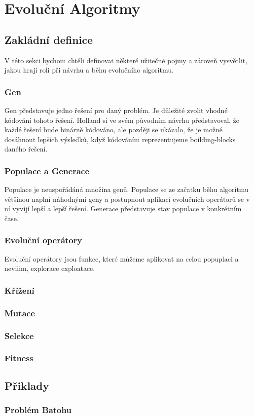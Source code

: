 \chapter{Evoluční Algoritmy}

\section{Zakládní definice}
V této sekci bychom chtěli definovat některé užitečné pojmy a zároveň vysvětlit, jakou hrají roli při návrhu a běhu evolučního algoritmu.
\subsection{Gen}
Gen představuje jedno řešení pro daný problém. Je důležité zvolit vhodné kódování tohoto řešení. Holland si ve svém původním návrhu představoval, že každé řešení bude binárně kódováno, ale později se ukázalo, že je možné dosáhnout lepších výsledků, když kódováním reprezentujeme boilding-blocks daného řešení.

\subsection{Populace a Generace}
Populace je neuspořádáná množina genů. Populace se ze začatku běhu algoritmu většinou naplní náhodnými geny a postupnout aplikací evolučních operátorů se v ní vyvíjí lepší a lepší řešení. Generace představuje stav populace v konkrétním čase.

\subsection{Evoluční operátory}
Evoluční operátory jsou funkce, které můžeme aplikovat na celou popuplaci a neviiim, explorace exploatace.

\subsection{Křížení}

\subsection{Mutace}

\subsection{Selekce}

\subsection{Fitness}

\section{Přiklady}
\subsection{Problém Batohu}
